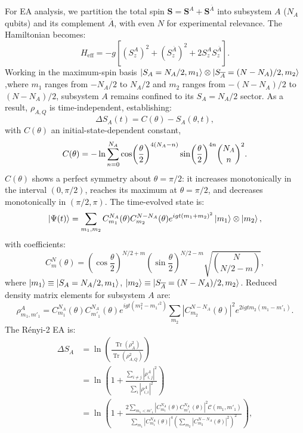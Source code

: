 \documentclass[reprint,superscriptaddress,preprintnumbers,longbibliography,
amsmath,amssymb,aps,floatfix,pra,twocolumn, tightenlines %
]{revtex4-2}
\begin{document}
    For EA analysis, we partition the total spin $\boldsymbol{S} = \boldsymbol{S}^A + \boldsymbol{S}^{\overline{A}}$ into subsystem $A$ ($N_A$ qubits) and its complement $\overline{A}$, with even $N$ for experimental relevance.
    The Hamiltonian becomes:
    \begin{equation}
    H_{\text{eff}} = -g\left[ (S_z^A)^2 + (S_z^{\overline{A}})^2 + 2 S_z^A S_z^{\overline{A}} \right].
    \end{equation}
    Working in the maximum-spin basis $\ket{S_A = N_A/2, m_1} \otimes \ket{S_{\overline{A}} = (N-N_A)/2, m_2}$,where $m_1$ ranges from $-N_A/2$ to $N_A/2$ and $m_2$ ranges from $-(N-N_A)/2$ to $(N-N_A)/2$,
    subsystem $A$ remains confined to its $S_A = N_A/2$ sector. As a result, $\rho_{A,Q}$ is time-independent, establishing:
    \begin{equation}
    \Delta S_A(t) = C(\theta) - S_A(\theta,t),
    \end{equation}
    with $C(\theta)$ an initial-state-dependent constant,
    \begin{equation}\label{c.theta}
        C(\theta) = -\ln \sum_{n=0}^{N_A} \cos({\theta \over 2})^{4(N_A-n)}\sin({\theta \over 2})^{4n}{\binom{N_A}{n}}^2.
    \end{equation}
    $C(\theta)$ shows a perfect symmetry about $\theta=\pi/2$: it increases monotonically in the interval $(0, \pi/2)$, reaches its maximum at $\theta = \pi/2$, and decreases monotonically in $(\pi/2, \pi)$.
    The time-evolved state is:
    \begin{equation}\label{state.evolution}
    \ket{\Psi(t)} = \sum_{m_1,m_2} C^{N_A}_{m_1}(\theta) C^{N-N_A}_{m_2}(\theta) e^{i g t (m_1 + m_2)^2} \ket{m_1} \otimes \ket{m_2},
    \end{equation}
    with coefficients:
    \begin{equation}
    C^{N}_{m}(\theta) = \left( \cos\frac{\theta}{2} \right)^{N/2 + m} \left( \sin\frac{\theta}{2} \right)^{N/2 - m} \sqrt{\binom{N}{N/2 - m}},
    \end{equation}
    where $\ket{m_1} \equiv \ket{S_A = N_A/2, m_1}$, $\ket{m_2} \equiv \ket{S_{\overline{A}} = (N-N_A)/2, m_2}$. Reduced density matrix elements for subsystem $A$ are:
    \begin{equation}\label{off.diagonal.rho}
    \rho^A_{m_1, m'_1} = C^{N_A}_{m_1}(\theta) C^{N_A}_{m'_1}(\theta) e^{i g t (m_1^2 - m_1'^2)} \sum_{m_2} |C^{N-N_A}_{m_2}(\theta)|^2 e^{2i g t m_2 (m_1 - m'_1)}.
    \end{equation}
    The Rényi-2 EA is:
    \begin{align}
    \Delta S_A &= \ln \left( \frac{\operatorname{Tr}(\rho_A^2)}{\operatorname{Tr}(\rho_{A,Q}^2)} \right) \nonumber \\
    &= \ln \left( 1 + \frac{\sum_{i\neq j}|\rho^A_{i,j}|^2}{\sum_{i}|\rho^A_{i,i}|^2}\right) \\
    &= \ln \left( 1 + \frac{2\sum_{m_1 < m'_1} |C^{N_A}_{m_1}(\theta) C^{N_A}_{m'_1}(\theta)|^2 \mathcal{C}(m_1, m'_1) }{ \sum_{m_1} |C^{N_A}_{m_1}(\theta)|^4 \left( \sum_{m_2} |C^{N-N_A}_{m_2}(\theta)|^2 \right)^2 } \right),
    \end{align}
\end{document}
